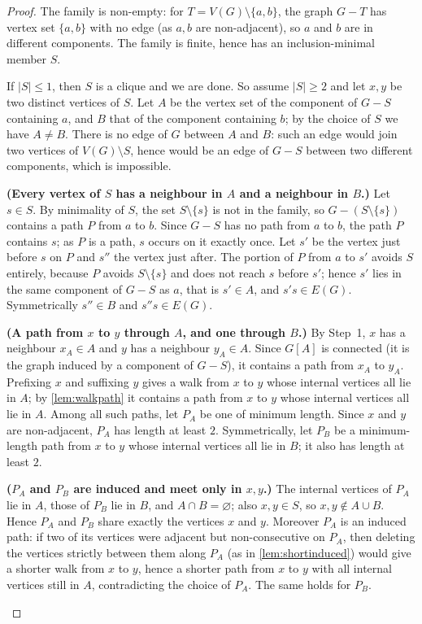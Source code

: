 \documentclass[11pt]{article}
\numberwithin{equation}{section}
\theoremstyle{plain}
\newcommand{\V}{V}
\begin{document}
\begin{proof}
The family is non-empty: for $T=\V(G)\setminus\{a,b\}$, the graph $G-T$ has vertex set
$\{a,b\}$ with no edge (as $a,b$ are non-adjacent), so $a$ and $b$ are in different
components. The family is finite, hence has an inclusion-minimal member $S$.

If $|S|\le 1$, then $S$ is a clique and we are done. So assume $|S|\ge 2$ and let $x,y$
be two distinct vertices of $S$. Let $A$ be the vertex set of the component of $G-S$
containing $a$, and $B$ that of the component containing $b$; by the choice of $S$ we
have $A\neq B$. There is no edge of $G$ between $A$ and $B$: such an edge would join two
vertices of $\V(G)\setminus S$, hence would be an edge of $G-S$ between two different
components, which is impossible.

\begin{steps}
\item\textbf{(Every vertex of $S$ has a neighbour in $A$ and a neighbour in $B$.)}
Let $s\in S$. By minimality of $S$, the set $S\setminus\{s\}$ is not in the family, so
$G-(S\setminus\{s\})$ contains a path $P$ from $a$ to $b$. Since $G-S$ has no path from
$a$ to $b$, the path $P$ contains $s$; as $P$ is a path, $s$ occurs on it exactly once.
Let $s'$ be the vertex just before $s$ on $P$ and $s''$ the vertex just after. The
portion of $P$ from $a$ to $s'$ avoids $S$ entirely, because $P$ avoids $S\setminus\{s\}$
and does not reach $s$ before $s'$; hence $s'$ lies in the same component of $G-S$ as
$a$, that is $s'\in A$, and $s's\in E(G)$. Symmetrically $s''\in B$ and $s''s\in E(G)$.

\item\textbf{(A path from $x$ to $y$ through $A$, and one through $B$.)}
By Step~1, $x$ has a neighbour $x_A\in A$ and $y$ has a neighbour $y_A\in A$. Since
$G[A]$ is connected (it is the graph induced by a component of $G-S$), it contains a
path from $x_A$ to $y_A$. Prefixing $x$ and suffixing $y$ gives a walk from $x$ to $y$
whose internal vertices all lie in $A$; by \cref{lem:walkpath} it contains a path from
$x$ to $y$ whose internal vertices all lie in $A$. Among all such paths, let $P_A$ be one
of minimum length. Since $x$ and $y$ are non-adjacent, $P_A$ has length at least $2$.
Symmetrically, let $P_B$ be a minimum-length path from $x$ to $y$ whose internal vertices
all lie in $B$; it also has length at least $2$.

\item\textbf{($P_A$ and $P_B$ are induced and meet only in $x,y$.)}
The internal vertices of $P_A$ lie in $A$, those of $P_B$ lie in $B$, and $A\cap
B=\varnothing$; also $x,y\in S$, so $x,y\notin A\cup B$. Hence $P_A$ and $P_B$ share
exactly the vertices $x$ and $y$. Moreover $P_A$ is an induced path: if two of its
vertices were adjacent but non-consecutive on $P_A$, then deleting the vertices strictly
between them along $P_A$ (as in \cref{lem:shortinduced}) would give a shorter walk from
$x$ to $y$, hence a shorter path from $x$ to $y$ with all internal vertices still in $A$,
contradicting the choice of $P_A$. The same holds for $P_B$.


\end{steps}
\end{proof}
\end{document}
